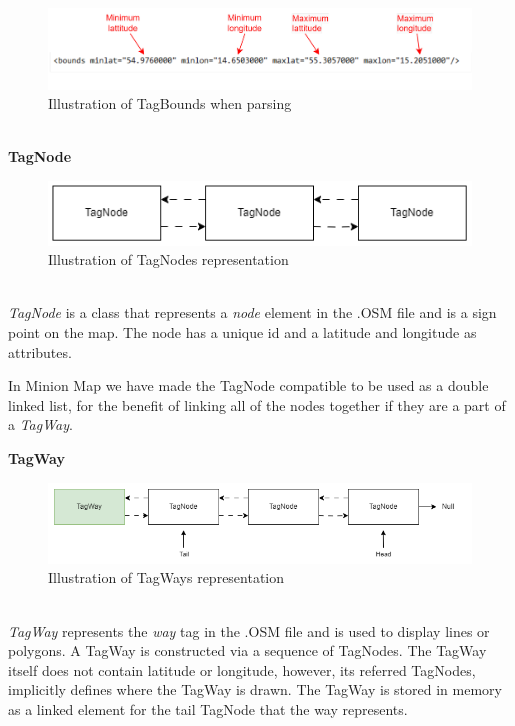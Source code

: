 \begin{figure}[ht]%
  \centering
  \includegraphics[width=15.5cm]{docs/material/TagBoundParse.png}%
  \caption{\centering Illustration of TagBounds when parsing}\label{tagNode}%
\end{figure}\\
\newpage
\textbf{TagNode}\\
\begin{figure}[ht]%
  \centering
  \includegraphics[width=12.5cm]{docs/material/TagNode.png}%
  \caption{\centering Illustration of TagNodes representation}\label{tagNode}%
\end{figure}\\
\textit{TagNode }is a class that represents a \textit{node }element in the .OSM file and is a sign point on the map. The node has a unique id and a latitude and longitude as attributes. 

In Minion Map we have made the TagNode compatible to be used as a double linked list, for the benefit of linking all of the nodes together if they are a part of a \textit{TagWay}.  

\textbf{TagWay}\\
\begin{figure}[ht]%
  \centering
  \includegraphics[width=14.5cm]{docs/material/TagWay.png}%
  \caption{\centering Illustration of TagWays representation}\label{TagWay}%
\end{figure}\\
\textit{TagWay }represents the \textit{way }tag in the .OSM file and is used to display lines or polygons. A TagWay is constructed via a sequence of TagNodes. The TagWay itself does not contain latitude or longitude, however, its referred TagNodes, implicitly defines where the TagWay is drawn. The TagWay is stored in memory as a linked element for the tail TagNode that the way represents.

